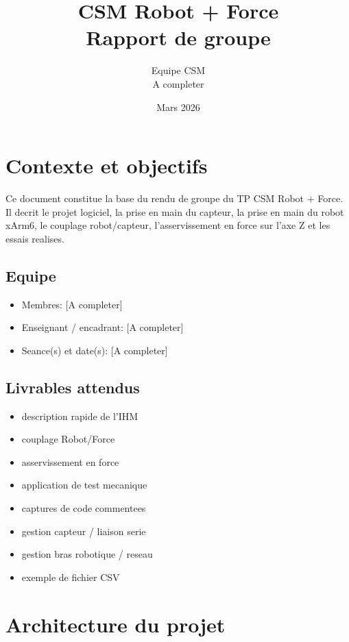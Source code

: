 \documentclass[11pt,a4paper]{article}
\title{CSM Robot + Force\\Rapport de groupe}
\author{Equipe CSM\\A completer}
\date{Mars 2026}
\begin{document}
\maketitle
\tableofcontents
\newpage

\section{Contexte et objectifs}

Ce document constitue la base du rendu de groupe du TP CSM Robot + Force.
Il decrit le projet logiciel, la prise en main du capteur, la prise en main du robot xArm6, le couplage robot/capteur, l'asservissement en force sur l'axe Z et les essais realises.

\subsection{Equipe}

\begin{itemize}
    \item Membres: [A completer]
    \item Enseignant / encadrant: [A completer]
    \item Seance(s) et date(s): [A completer]
\end{itemize}

\subsection{Livrables attendus}

\begin{itemize}
    \item description rapide de l'IHM
    \item couplage Robot/Force
    \item asservissement en force
    \item application de test mecanique
    \item captures de code commentees
    \item gestion capteur / liaison serie
    \item gestion bras robotique / reseau
    \item exemple de fichier CSV
\end{itemize}

\section{Architecture du projet}
\end{document}
